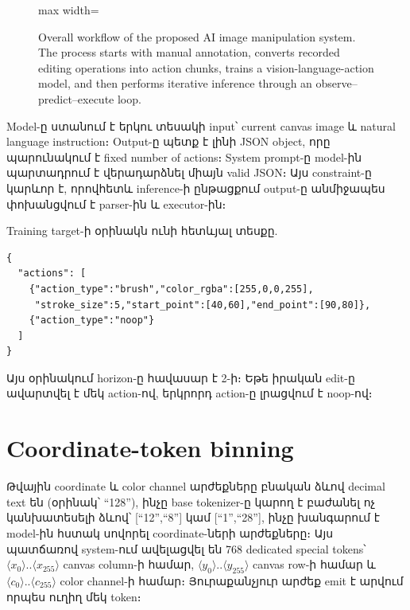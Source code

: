 \documentclass[12pt,a4paper]{report}
\newcommand{\Eng}[1]{\textenglish{#1}}
\begin{document}
\begin{figure}[htbp]
\begin{adjustbox}{max width=\textwidth}
\end{adjustbox}

\caption{Overall workflow of the proposed AI image manipulation system. The process starts with manual annotation, converts recorded editing operations into action chunks, trains a vision-language-action model, and then performs iterative inference through an observe--predict--execute loop.}
\label{fig:system-workflow}

\end{figure}

Model-ը ստանում է երկու տեսակի input՝ current canvas image և natural language instruction։ Output-ը պետք է լինի JSON object, որը պարունակում է fixed number of actions։ System prompt-ը model-ին պարտադրում է վերադարձնել միայն valid JSON։ Այս constraint-ը կարևոր է, որովհետև inference-ի ընթացքում output-ը անմիջապես փոխանցվում է parser-ին և executor-ին։

Training target-ի օրինակն ունի հետևյալ տեսքը.
\begin{lstlisting}[style=code]
{
  "actions": [
    {"action_type":"brush","color_rgba":[255,0,0,255],
     "stroke_size":5,"start_point":[40,60],"end_point":[90,80]},
    {"action_type":"noop"}
  ]
}
\end{lstlisting}

Այս օրինակում horizon-ը հավասար է 2-ի։ Եթե իրական edit-ը ավարտվել է մեկ action-ով, երկրորդ action-ը լրացվում է noop-ով։

\section{Coordinate-token binning}

Թվային coordinate և color channel արժեքները բնական ձևով decimal text են (օրինակ՝ \Eng{``128''}), ինչը base tokenizer-ը կարող է բաժանել ոչ կանխատեսելի ձևով՝ \Eng{[``12'',``8'']} կամ \Eng{[``1'',``28'']}, ինչը խանգարում է model-ին հստակ սովորել coordinate-ների արժեքները։ Այս պատճառով system-ում ավելացվել են 768 dedicated special tokens՝ $\langle x_0 \rangle..\langle x_{255} \rangle$ canvas column-ի համար, $\langle y_0 \rangle..\langle y_{255} \rangle$ canvas row-ի համար և $\langle c_0 \rangle..\langle c_{255} \rangle$ color channel-ի համար։ Յուրաքանչյուր արժեք emit է արվում որպես ուղիղ մեկ token։
\end{document}
